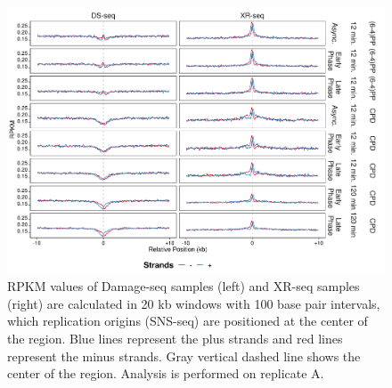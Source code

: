 \begin{figure}[H]
\begin{center}
\includegraphics[width=\textwidth]{Chapters/7_appendix/figures/supfig48}
\caption[Damage and repair events of replication origins in 20 kb (replicate A).]{RPKM values of Damage-seq samples (left) and XR-seq samples (right) are calculated in 20 kb windows with 100 base pair intervals, which replication origins (SNS-seq) are positioned at the center of the region. Blue lines represent the plus strands and red lines represent the minus strands. Gray vertical dashed line shows the center of the region. Analysis is performed on replicate A.}
\label{supfig:rpkm20snsA}
\end{center}
\end{figure}

